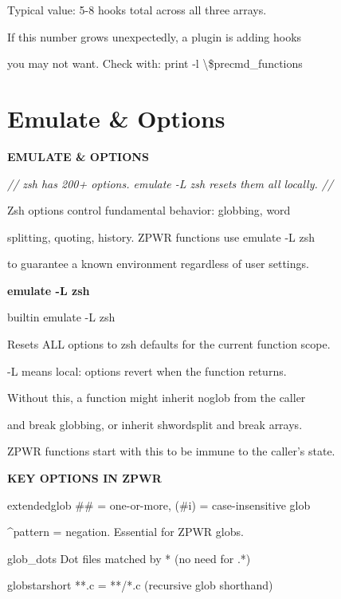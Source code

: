 \documentclass[11pt,a4paper,twoside]{book}
\begin{document}
Typical value: 5-8 hooks total across all three arrays.

If this number grows unexpectedly, a plugin is adding hooks

you may not want. Check with: print -l \textbackslash{}\$precmd\_functions


\vspace{16pt}

\section{Emulate \& Options}


\vspace{10pt}
{\large\bfseries\color{neoncyan} EMULATE \& OPTIONS}\vspace{6pt}

{\small\itshape\color{dimtext} // zsh has 200+ options. emulate -L zsh resets them all locally. //}

Zsh options control fundamental behavior: globbing, word

splitting, quoting, history. ZPWR functions use emulate -L zsh

to guarantee a known environment regardless of user settings.


\vspace{12pt}
{\bfseries\color{neonyellow} emulate -L zsh}\vspace{4pt}

builtin emulate -L zsh

Resets ALL options to zsh defaults for the current function scope.

-L means local: options revert when the function returns.

Without this, a function might inherit noglob from the caller

and break globbing, or inherit shwordsplit and break arrays.

ZPWR functions start with this to be immune to the caller's state.


\vspace{12pt}
{\bfseries\color{neonyellow} KEY OPTIONS IN ZPWR}\vspace{4pt}

extendedglob      \#\# = one-or-more, (\#i) = case-insensitive glob

\textasciicircum{}pattern = negation. Essential for ZPWR globs.

glob\_dots         Dot files matched by * (no need for .*)

globstarshort     **.c = **/*.c (recursive glob shorthand)
\end{document}
